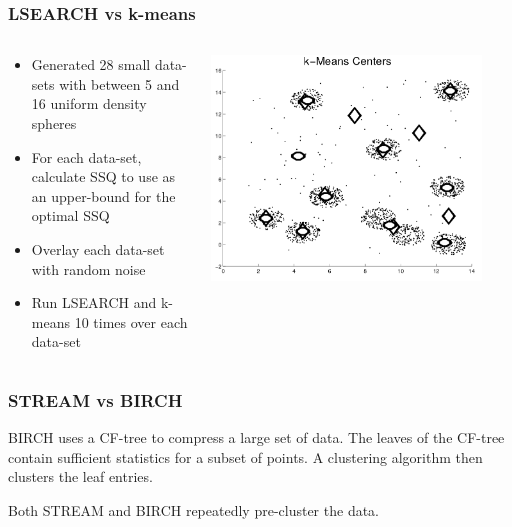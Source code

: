 \documentclass{beamer}
\begin{document}
\frame
{
  \frametitle{LSEARCH vs k-means}
  

  
  \begin{columns}
    \begin{column}{0.5\textwidth}
       \begin{itemize}
          \item{Generated 28 small data-sets with between 5 and 16 uniform density spheres}
          \item{For each data-set, calculate SSQ to use as an upper-bound for the optimal SSQ}
          \item{Overlay each data-set with random noise}
          \item{Run LSEARCH and k-means 10 times over each data-set}
      \end{itemize}
    \end{column}
    \begin{column}{0.5\textwidth}
        \begin{center}
         \includegraphics[width=0.9\textwidth]{figures/k-means_clusters.png}      
        \end{center}
    \end{column}
  \end{columns}  
  
}

\frame
{
  \frametitle{STREAM vs BIRCH}
  BIRCH uses a CF-tree to compress a large set of data. The leaves of the CF-tree contain sufficient statistics for a subset of points. A clustering algorithm then clusters the leaf entries. 
  
  Both STREAM and BIRCH repeatedly pre-cluster the data. 
}


  
\end{document}
